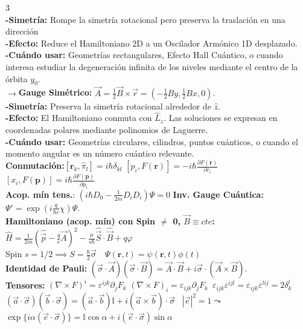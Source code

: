 \documentclass[8pt,a4paper,fleqn]{extarticle} %
\begin{document}
\begin{multicols}{3}
\\
 \textbf{-Simetría:} Rompe la simetría rotacional pero preserva la traslación en una dirección\\
 \textbf{-Efecto:} Reduce el Hamiltoniano 2D a un Oscilador Armónico 1D desplazado.\\
 \textbf{-Cuándo usar:} Geometrías rectangulares, Efecto Hall Cuántico, o cuando interesa estudiar la degeneración infinita de los niveles mediante el centro de la órbita $y_0$.\\
$\rightarrow$\textbf{Gauge Simétrico:} $\vec{A} = \frac{1}{2}\vec{B} \times \vec{r} = (-\frac{1}{2}By, \frac{1}{2}Bx, 0)$.\\
\textbf{-Simetría:} Preserva la simetría rotacional alrededor de $\hat{z}$.\\
\textbf{-Efecto:} El Hamiltoniano conmuta con $\hat{L}_z$. Las soluciones se expresan en coordenadas polares mediante polinomios de Laguerre.\\
\textbf{-Cuándo usar:} Geometrías circulares, cilindros, puntos cuánticos, o cuando el momento angular es un número cuántico relevante.
\\
\textbf{Conmutación:}$[ \mathbf{r}_k, \hat{\pi}_l] = i \hbar \delta_{kl}$\;\; \; 
$[p_i, F(\mathbf{r})] =-i\hbar \frac{\partial F(\mathbf{r})}{\partial r_i} $ \;\,\;\; $[x_i, F(\mathbf{p})] =i\hbar \frac{\partial F(\mathbf{p})}{\partial p_i}$
\\\textbf{Acop. mín tens.}: $(i\hbar D_0 - \frac{1}{2m} D_i D_i) \Psi = 0$
\textbf{Inv. Gauge Cuántica:} $\Psi' = \exp(i \frac{q}{\hbar c} \chi)\Psi$.\\
\textbf{Hamiltoniano (acop. mín) con Spin $\neq$ 0, $\vec{B} \equiv cte$:} $\hat{H} = \frac{1}{2m}(\hat{\vec{p}} - \frac{q}{c}\vec{A})^2 - \frac{\mu}{s\hbar}\hat{\vec{S}} \cdot\hat{\vec{B}}+ q\varphi$ \\
Spin $s=1/2 \implies S = \frac{\hbar}{2} \vec{\sigma} \;\;\;\, \Psi(\mathbf{r}, t)  =\psi(\mathbf{r}, t) \phi(t)
$\\ 
\textbf{Identidad de Pauli:} $(\vec{\sigma} \cdot \vec{A})(\vec{\sigma} \cdot \vec{B}) = \vec{A} \cdot \vec{B} + i \vec{\sigma} \cdot (\vec{A} \times \vec{B})$.\\
\textbf{Tensores:} $(\nabla \times F)^i = \varepsilon^{ijk} \partial_j F_k$\;\;\; $(\nabla \times F)_i = \varepsilon_{ijk} \partial_j F_k$\;\;\, $\varepsilon_{ijk}\varepsilon^{ijl}=\varepsilon_{ijk}\varepsilon^{lij}=2\delta_k^l$\\
$(\vec{a} \cdot \vec{\sigma})(\vec{b} \cdot \vec{\sigma}) = (\vec{a} \cdot \vec{b})\mathbb{I} + i (\vec{a} \times \vec{b}) \cdot \vec{\sigma}$ \;\;\,\;  
 $|\vec{e}|^2 = 1 \leadsto$
 $\exp \{ i \alpha (\vec{e} \cdot \vec{\sigma}) \} = \mathbb{I} \cos \alpha + i (\vec{e} \cdot \vec{\sigma}) \sin \alpha$\\


\end{multicols}
\end{document}
